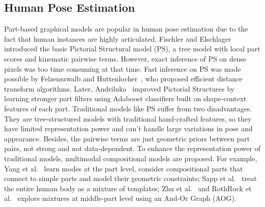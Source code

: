 \subsection{Human Pose Estimation}
Part-based graphical models are popular in human pose estimation due to the fact that human instances are highly articulated. 
Fischler and Elschlager~\cite{fischler1973representation} introduced the basic Pictorial Structural model (PS), a tree model with local part scores and kinematic pairwise terms.
However, exact inference of PS on dense pixels was too time consuming at that time. Fast inference on PS was made possible by Felzenszwalb and Huttenlocher~\cite{felzenszwalb2005pictorial}, who proposed efficient distance transform algorithms. 
Later, Andriluka~\cite{andriluka2009pictorial} improved Pictorial Structures by learning stronger part filters using Adaboost classifiers built on shape-context features of each part. Traditional models like PS suffer from two disadvantages.
They are tree-structured models with traditional hand-crafted features, so they have limited representation power and can't handle large variations in pose and appearance.
Besides, the pairwise terms are just geometric priors between part pairs, not strong and not data-dependent.
To enhance the representation power of traditional models, multimodal compositional models are proposed. For example, Yang et al.~\cite{yang2011articulated} learn modes at the part level, consider compositional parts that connect to simple parts and model their geometric constraints;
Sapp et al.~\cite{sapp2013modec} treat the entire human body as a mixture of templates;
Zhu et al.~\cite{zhu2008max} and RothRock et al.~\cite{rothrock2013integrating} explore mixtures at middle-part level using an And-Or Graph (AOG).
 
